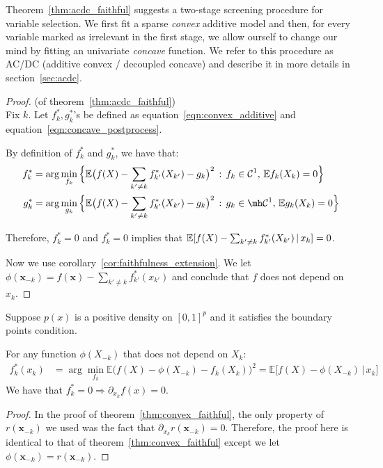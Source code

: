 Theorem~\ref{thm:acdc_faithful} suggests a two-stage screening procedure for variable selection. We first fit a sparse \emph{convex} additive model and then, for every variable marked as irrelevant in the first stage, we allow ourself to change our mind by fitting an univariate \emph{concave} function. We refer to this procedure as AC/DC (additive convex / decoupled concave) and describe it in more details in section~\ref{sec:acdc}.

\begin{proof} (of theorem~\ref{thm:acdc_faithful}) \\
Fix $k$. Let $f^*_k, g^*_k$'s be defined as equation~\ref{eqn:convex_additive} and equation~\ref{eqn:concave_postprocess}.

By definition of $f^*_k$ and $g^*_k$, we have that:
\begin{align*}
f^*_k &= \arg\min_{f_k} \Big\{
   \E\big( f(X) - \sum_{k' \neq k} f^*_{k'}(X_{k'}) - g_k \big)^2 
    \,:\, f_k \in  \mathcal{C}^1,\, \E f_k(X_k) = 0 
  \Big\} \\
g^*_k &= \arg\min_{g_k} \Big\{
   \E\big( f(X) - \sum_{k' \neq k} f^*_{k'}(X_{k'}) - g_k \big)^2 
    \,:\, g_k \in \mh \mathcal{C}^1,\, \E g_k(X_k) = 0 
  \Big\}
\end{align*}

Therefore, $f^*_k = 0$ and $f^*_k = 0$ implies that ${\mathbb E}[ f(X) - \sum_{k'\neq k} f^*_{k'}(X_{k'}) {\,|\,} x_k] = 0$.

Now we use corollary~\ref{cor:faithfulness_extension}. We let $\phi(\mathbf{x}_{-k}) = f(\mathbf{x}) - \sum_{k' \neq k} f^*_{k'} (x_{k'})$ and conclude that $f$ does not depend on $x_k$. 
\end{proof}


\begin{corollary} 
\label{cor:faithfulness_extension}
Suppose $p(x)$ is a positive density on $[0,1]^p$ and it satisfies the boundary points condition.

For any function $\phi(X_{-k})$ that does not depend on $X_k$:
 \begin{align*}
f^*_k(x_k) &= \arg\min_{f_k} \mathbb{E} \Big( f(X) 
           - \phi(X_{-k}) - f_k(X_k) \Big)^2 
      = \mathbb{E}\Big[ f(X) - \phi(X_{-k}) \,|\, x_k\Big] 
\end{align*}
We have that $ f^*_k = 0 \Rightarrow \partial_{x_k} f(x) = 0$.
\end{corollary}

\begin{proof}
In the proof of theorem~\ref{thm:convex_faithful}, the only property of $r(\mathbf{x}_{-k})$ we used was the fact that $\partial_{x_k} r(\mathbf{x}_{-k}) = 0$. Therefore, the proof here is identical to that of theorem~\ref{thm:convex_faithful} except we let $\phi(\mathbf{x}_{-k})= r(\mathbf{x}_{-k}).$
\end{proof}


